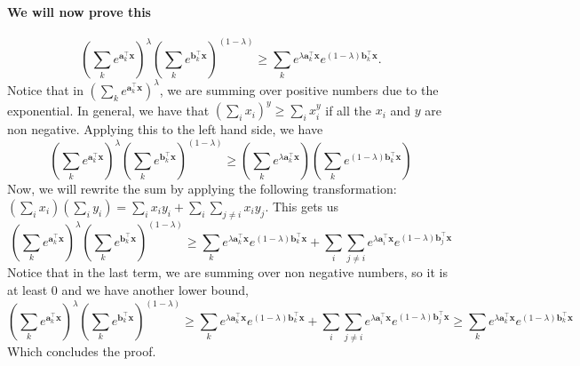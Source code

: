 \documentclass{../../tex_import/ETHuebung_english_theory}
\begin{document}
\begin{enumerate}
	\paragraph{We will now prove this}
	\[
	\left(\sum_k e^{\mathbf{a}_k^\top\mathbf{x}}\right)^\lambda
	\left(\sum_k e^{\mathbf{b}_k^\top\mathbf{x}}\right)^{(1 - \lambda)}
	\geq 
	\sum_k e^{\lambda\mathbf{a}_k^\top\mathbf{x}}e^{(1-\lambda)\mathbf{b}_k^\top\mathbf{x}}.
	\]
	Notice that in $\left(\sum_k e^{\mathbf{a}_k^\top\mathbf{x}}\right)^\lambda$, we are summing over positive numbers due to the exponential. In general, we have that $\left(\sum_i x_i\right)^y \geq \sum_i x_i^y$ if all the $x_i$ and $y$ are non negative. Applying this to the left hand side, we have 
	\[
	\left(\sum_k e^{\mathbf{a}_k^\top\mathbf{x}}\right)^\lambda
	\left(\sum_k e^{\mathbf{b}_k^\top\mathbf{x}}\right)^{(1 - \lambda)}
	\geq
	\left(\sum_k e^{\lambda \mathbf{a}_k^\top\mathbf{x}}\right)
	\left(\sum_k e^{(1-\lambda) \mathbf{b}_k^\top\mathbf{x}}\right)
	\]
	Now, we will rewrite the sum by applying the following transformation: $(\sum_i x_i)(\sum_i y_i) = \sum_i x_iy_i + \sum_i \sum_{j\not=i} x_iy_j$. This gets us 
	\[
	\left(\sum_k e^{\mathbf{a}_k^\top\mathbf{x}}\right)^\lambda
	\left(\sum_k e^{\mathbf{b}_k^\top\mathbf{x}}\right)^{(1 - \lambda)}
	\geq
	\sum_k e^{\lambda \mathbf{a}_k^\top\mathbf{x}}e^{(1-\lambda) \mathbf{b}_k^\top\mathbf{x}}
	+
	\sum_i \sum_{j \not= i} e^{\lambda \mathbf{a}_i^\top\mathbf{x}}e^{(1-\lambda) \mathbf{b}_j^\top\mathbf{x}}
	\]
	Notice that in the last term, we are summing over non negative numbers, so it is at least $0$ and we have another lower bound,
	\[
	\left(\sum_k e^{\mathbf{a}_k^\top\mathbf{x}}\right)^\lambda
	\left(\sum_k e^{\mathbf{b}_k^\top\mathbf{x}}\right)^{(1 - \lambda)}
	\geq
	\sum_k e^{\lambda \mathbf{a}_k^\top\mathbf{x}}e^{(1-\lambda) \mathbf{b}_k^\top\mathbf{x}}
	+
	\sum_i \sum_{j \not= i} e^{\lambda \mathbf{a}_i^\top\mathbf{x}}e^{(1-\lambda) \mathbf{b}_j^\top\mathbf{x}}
	\geq
	\sum_k e^{\lambda \mathbf{a}_k^\top\mathbf{x}}e^{(1-\lambda) \mathbf{b}_k^\top\mathbf{x}}
	\]
	Which concludes the proof.
\end{enumerate}
\end{document}

